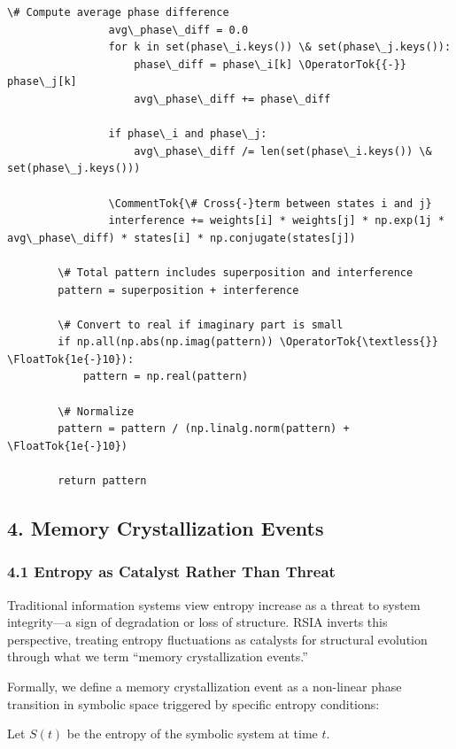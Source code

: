 \documentclass[12pt]{article}
\begin{document}
\begin{lstlisting}[basicstyle=\ttfamily\small]
                \# Compute average phase difference
                avg\_phase\_diff = 0.0
                for k in set(phase\_i.keys()) \& set(phase\_j.keys()):
                    phase\_diff = phase\_i[k] \OperatorTok{{-}} phase\_j[k]
                    avg\_phase\_diff += phase\_diff
                
                if phase\_i and phase\_j:
                    avg\_phase\_diff /= len(set(phase\_i.keys()) \& set(phase\_j.keys()))
                
                \CommentTok{\# Cross{-}term between states i and j}
                interference += weights[i] * weights[j] * np.exp(1j * avg\_phase\_diff) * states[i] * np.conjugate(states[j])
        
        \# Total pattern includes superposition and interference
        pattern = superposition + interference
        
        \# Convert to real if imaginary part is small
        if np.all(np.abs(np.imag(pattern)) \OperatorTok{\textless{}} \FloatTok{1e{-}10}):
            pattern = np.real(pattern)
        
        \# Normalize
        pattern = pattern / (np.linalg.norm(pattern) + \FloatTok{1e{-}10})
        
        return pattern
\end{lstlisting}

\subsection{4. Memory Crystallization
Events}\label{memory-crystallization-events}

\subsubsection{4.1 Entropy as Catalyst Rather Than
Threat}\label{entropy-as-catalyst-rather-than-threat}

Traditional information systems view entropy increase as a threat to
system integrity---a sign of degradation or loss of structure. RSIA
inverts this perspective, treating entropy fluctuations as catalysts for
structural evolution through what we term ``memory crystallization
events.''

Formally, we define a memory crystallization event as a non-linear phase
transition in symbolic space triggered by specific entropy conditions:

Let \(S(t)\) be the entropy of the symbolic system at time \(t\).
\end{document}
